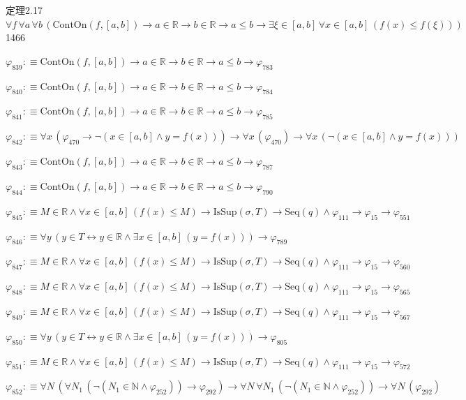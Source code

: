\begin{fullproof}{定理2.17}{$\forall f\,\forall a\,\forall b\,(\mathrm{ContOn}(f,[a,b]) \to a \in \mathbb{R} \to b \in \mathbb{R} \to a \leq b \to \exists \xi \in [a,b]\,\forall x \in [a,b]\,(f(x) \leq f(\xi)))$}{1466}
\begin{abbrevlist}
\item $\varphi_{839} :\equiv \mathrm{ContOn}(f,[a,b]) \to a \in \mathbb{R} \to b \in \mathbb{R} \to a \leq b \to \varphi_{783}$
\item $\varphi_{840} :\equiv \mathrm{ContOn}(f,[a,b]) \to a \in \mathbb{R} \to b \in \mathbb{R} \to a \leq b \to \varphi_{784}$
\item $\varphi_{841} :\equiv \mathrm{ContOn}(f,[a,b]) \to a \in \mathbb{R} \to b \in \mathbb{R} \to a \leq b \to \varphi_{785}$
\item $\varphi_{842} :\equiv \forall x\,(\varphi_{470} \to \neg (x \in [a,b] \land y = f(x))) \to \forall x\,(\varphi_{470}) \to \forall x\,(\neg (x \in [a,b] \land y = f(x)))$
\item $\varphi_{843} :\equiv \mathrm{ContOn}(f,[a,b]) \to a \in \mathbb{R} \to b \in \mathbb{R} \to a \leq b \to \varphi_{787}$
\item $\varphi_{844} :\equiv \mathrm{ContOn}(f,[a,b]) \to a \in \mathbb{R} \to b \in \mathbb{R} \to a \leq b \to \varphi_{790}$
\item $\varphi_{845} :\equiv M \in \mathbb{R} \land \forall x \in [a,b]\,(f(x) \leq M) \to \mathrm{IsSup}(\sigma,T) \to \mathrm{Seq}(q) \land \varphi_{111} \to \varphi_{15} \to \varphi_{551}$
\item $\varphi_{846} :\equiv \forall y\,(y \in T \leftrightarrow y \in \mathbb{R} \land \exists x \in [a,b]\,(y = f(x))) \to \varphi_{789}$
\item $\varphi_{847} :\equiv M \in \mathbb{R} \land \forall x \in [a,b]\,(f(x) \leq M) \to \mathrm{IsSup}(\sigma,T) \to \mathrm{Seq}(q) \land \varphi_{111} \to \varphi_{15} \to \varphi_{560}$
\item $\varphi_{848} :\equiv M \in \mathbb{R} \land \forall x \in [a,b]\,(f(x) \leq M) \to \mathrm{IsSup}(\sigma,T) \to \mathrm{Seq}(q) \land \varphi_{111} \to \varphi_{15} \to \varphi_{565}$
\item $\varphi_{849} :\equiv M \in \mathbb{R} \land \forall x \in [a,b]\,(f(x) \leq M) \to \mathrm{IsSup}(\sigma,T) \to \mathrm{Seq}(q) \land \varphi_{111} \to \varphi_{15} \to \varphi_{567}$
\item $\varphi_{850} :\equiv \forall y\,(y \in T \leftrightarrow y \in \mathbb{R} \land \exists x \in [a,b]\,(y = f(x))) \to \varphi_{805}$
\item $\varphi_{851} :\equiv M \in \mathbb{R} \land \forall x \in [a,b]\,(f(x) \leq M) \to \mathrm{IsSup}(\sigma,T) \to \mathrm{Seq}(q) \land \varphi_{111} \to \varphi_{15} \to \varphi_{572}$
\item $\varphi_{852} :\equiv \forall N\,(\forall N_{1}\,(\neg (N_{1} \in \mathbb{N} \land \varphi_{252})) \to \varphi_{292}) \to \forall N\,\forall N_{1}\,(\neg (N_{1} \in \mathbb{N} \land \varphi_{252})) \to \forall N\,(\varphi_{292})$

\end{abbrevlist}
\end{fullproof}
